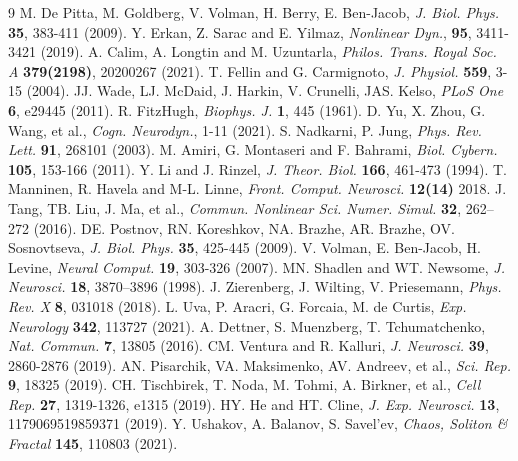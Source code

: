 \documentclass[%
 aip,
 amsmath,amssymb,
 reprint,%
]{revtex4-1}
\begin{document}
\begin{thebibliography}{9}
		 M. De Pitta, M. Goldberg, V. Volman, H. Berry, E. Ben-Jacob, \textit{J. Biol. Phys.} \textbf{35}, 383-411 (2009).
		 Y. Erkan, Z. Sarac and E. Yilmaz, \textit{Nonlinear Dyn.}, \textbf{95}, 3411-3421 (2019).
		 A. Calim, A. Longtin and M. Uzuntarla, \textit{Philos. Trans. Royal Soc. A} \textbf{379(2198)}, 20200267 (2021).
		 T. Fellin and G. Carmignoto, \textit{J. Physiol.} \textbf{559}, 3-15 (2004).
		 JJ. Wade, LJ. McDaid, J. Harkin, V. Crunelli, JAS. Kelso, \textit{PLoS One} \textbf{6}, e29445 (2011).
		 R. FitzHugh, \textit{Biophys. J.} \textbf{1}, 445 (1961). 
		 D. Yu, X. Zhou, G. Wang, et al., \textit{Cogn. Neurodyn.}, 1-11 (2021).
		 S. Nadkarni, P. Jung, \textit{ Phys. Rev. Lett.} \textbf{ 91}, 268101 (2003). 
		 M. Amiri, G. Montaseri and F. Bahrami, \textit{Biol. Cybern.} \textbf{105}, 153-166 (2011).
		 Y. Li and J. Rinzel, \textit{J. Theor. Biol.} \textbf{166}, 461-473 (1994). 
		 T. Manninen, R. Havela and M-L. Linne, \textit{ Front. Comput. Neurosci.} \textbf{12(14)} 2018.
		 J. Tang, TB. Liu, J. Ma, et al., \textit{Commun. Nonlinear Sci. Numer. Simul.} \textbf{32}, 262–272 (2016).
		 DE. Postnov, RN. Koreshkov, NA. Brazhe, AR. Brazhe, OV. Sosnovtseva, \textit{J. Biol. Phys.} \textbf{35}, 425-445 (2009).
		 V. Volman, E. Ben-Jacob, H. Levine, \textit{Neural Comput.} \textbf{19}, 303-326 (2007).
		 MN. Shadlen and WT. Newsome, \textit{J. Neurosci.} \textbf{18}, 3870–3896 (1998). 
		 J. Zierenberg, J. Wilting, V. Priesemann, \textit{Phys. Rev. X} \textbf{8}, 031018 (2018). 
		 L. Uva, P. Aracri, G. Forcaia, M. de Curtis, \textit{Exp. Neurology} \textbf{342}, 113727 (2021).
		 A. Dettner, S. Muenzberg, T. Tchumatchenko, \textit{Nat. Commun.} \textbf{7}, 13805 (2016).
		 CM. Ventura and R. Kalluri, \textit{J. Neurosci.} \textbf{39}, 2860-2876 (2019).
		 AN. Pisarchik, VA. Maksimenko, AV. Andreev, et al., \textit{Sci. Rep.} \textbf{9}, 18325 (2019). 
		 CH. Tischbirek, T. Noda, M. Tohmi, A. Birkner, et al., \textit{Cell Rep.} \textbf{27}, 1319-1326, e1315 (2019). 
		 HY. He and HT. Cline, \textit{J. Exp. Neurosci.} \textbf{13}, 1179069519859371 (2019).
		 Y. Ushakov, A. Balanov, S. Savel’ev, \textit{Chaos, Soliton \& Fractal} \textbf{145}, 110803 (2021).

\end{thebibliography}
\end{document}
